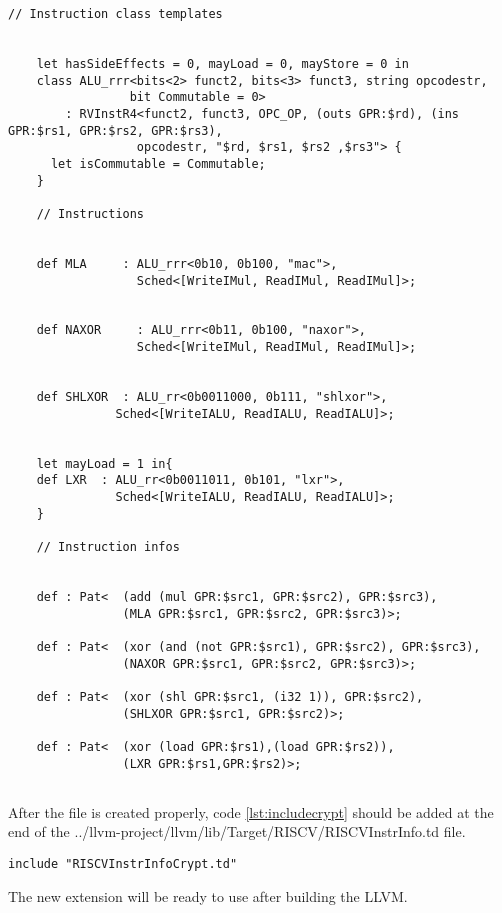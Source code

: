 \begin{lstlisting}[caption={RISCVInstrInfoCrypt.td file},label={lst:crypt_file}]
	// Instruction class templates
	

	let hasSideEffects = 0, mayLoad = 0, mayStore = 0 in
	class ALU_rrr<bits<2> funct2, bits<3> funct3, string opcodestr,
				 bit Commutable = 0>
		: RVInstR4<funct2, funct3, OPC_OP, (outs GPR:$rd), (ins GPR:$rs1, GPR:$rs2, GPR:$rs3),
				  opcodestr, "$rd, $rs1, $rs2 ,$rs3"> {
	  let isCommutable = Commutable;
	}
	
	// Instructions
	
	
	def MLA     : ALU_rrr<0b10, 0b100, "mac">,
				  Sched<[WriteIMul, ReadIMul, ReadIMul]>;
	
	
	def NAXOR     : ALU_rrr<0b11, 0b100, "naxor">,
				  Sched<[WriteIMul, ReadIMul, ReadIMul]>;
	
	
	def SHLXOR  : ALU_rr<0b0011000, 0b111, "shlxor">,
			   Sched<[WriteIALU, ReadIALU, ReadIALU]>;
	
	
	let mayLoad = 1 in{
	def LXR  : ALU_rr<0b0011011, 0b101, "lxr">,
			   Sched<[WriteIALU, ReadIALU, ReadIALU]>;
	}
	
	// Instruction infos
	
	
	def : Pat<  (add (mul GPR:$src1, GPR:$src2), GPR:$src3),
				(MLA GPR:$src1, GPR:$src2, GPR:$src3)>;
	
	def : Pat<  (xor (and (not GPR:$src1), GPR:$src2), GPR:$src3),
				(NAXOR GPR:$src1, GPR:$src2, GPR:$src3)>;
	
	def : Pat<  (xor (shl GPR:$src1, (i32 1)), GPR:$src2),
				(SHLXOR GPR:$src1, GPR:$src2)>;
	
	def : Pat<  (xor (load GPR:$rs1),(load GPR:$rs2)),
				(LXR GPR:$rs1,GPR:$rs2)>;
	
\end{lstlisting}

After the file is created properly, code \ref{lst:includecrypt} should be added at the end of the ../llvm-project/llvm/lib/Target/RISCV/RISCVInstrInfo.td file.
\begin{lstlisting}[caption={Include line},label={lst:includecrypt}]
include "RISCVInstrInfoCrypt.td"
\end{lstlisting}
The new extension will be ready to use after building the LLVM.
\newpage
